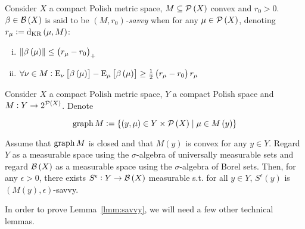 \begin{samepage}
\begin{definition}

Consider $X$ a compact Polish metric space, $M \subseteq \mathcal{P}\left(X\right)$ convex and $r_0 > 0$. $\beta \in \mathcal{B}\left(X\right)$ is said to be \emph{$\left(M,r_0\right)$-savvy} when for any $\mu \in \mathcal{P}\left(X\right)$, denoting $r_\mu:=\operatorname{d}_{\textnormal{KR}}\left(\mu,M\right)$:

\begin{enumerate}[i.]

\item $\lVert \beta\left(\mu\right) \rVert \leq \left(r_\mu - r_0\right)_+$
\item $\forall \nu \in M: \operatorname{E}_\nu\left[\beta\left(\mu\right)\right] - \operatorname{E}_\mu\left[\beta\left(\mu\right)\right] \geq \frac{1}{2}\left(r_\mu - r_0\right) r_\mu$

\end{enumerate}

\end{definition}
\end{samepage}

\begin{samepage}
\begin{lemma}
\label{lmm:savvy}

Consider $X$ a compact Polish metric space, $Y$ a compact Polish space and $M: Y \rightarrow 2^{\mathcal{P}\left(X\right)}$. Denote

\begin{equation*}
\operatorname{graph}{M}:=\{\left(y, \mu\right) \in Y \times \mathcal{P}\left(X\right) \mid \mu \in M\left(y\right)\}
\end{equation*}

Assume that $\operatorname{graph}{M}$ is closed and that $M\left(y\right)$ is convex for any $y \in Y$. Regard $Y$ as a measurable space using the $\sigma$-algebra of universally measurable sets and regard $\mathcal{B}\left(X\right)$ as a measurable space using the $\sigma$-algebra of Borel sets. Then, for any $\epsilon > 0$, there exists $S^\epsilon: Y \rightarrow \mathcal{B}\left(X\right)$ measurable s.t. for all $y \in Y$, $S^\epsilon\left(y\right)$ is $\left(M\left(y\right),\epsilon\right)$-savvy.

\end{lemma}
\end{samepage}

In order to prove Lemma~\ref{lmm:savvy}, we will need a few other technical lemmas.

